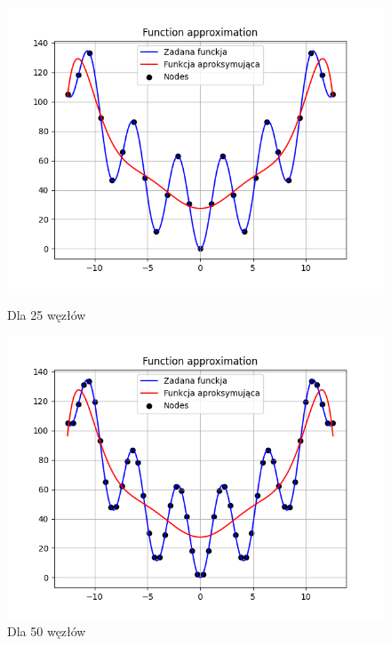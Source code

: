 \documentclass{article}
\begin{document}
\begin{figure}[H]
  \begin{minipage}[b]{0.49\textwidth}
    \begin{minipage}[b]{\textwidth}
      \includegraphics[width=\textwidth]{img28.png}
      \caption{Dla 25 węzłów}
    \end{minipage}
    \vspace*{\fill}
    \begin{minipage}[b]{\textwidth}
      \includegraphics[width=\textwidth]{img29.png}
      \caption{Dla 50 węzłów}
    \end{minipage}
  \end{minipage}
  \hfill
  \begin{minipage}[b]{0.49\textwidth}

\end{minipage}
\end{figure}
\end{document}
